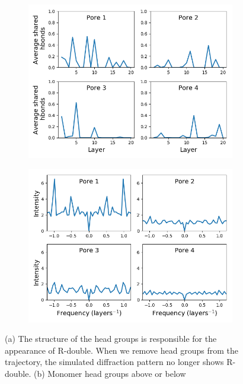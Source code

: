 \documentclass[journal=jpcbfk,manuscript=article]{achemso}
\begin{document}
\begin{figure}[!htb]
\begin{subfigure}{0.45\textwidth}
  \caption{}\label{fig:hbond_visualization}
  \end{subfigure}
  \begin{subfigure}{0.45\textwidth}
  \includegraphics[width=\textwidth]{pore_hbonds.png}
  \caption{}\label{fig:pore_hbonds}
  \end{subfigure}
  \begin{subfigure}{0.45\textwidth}
  \includegraphics[width=\textwidth]{pore_hbonds_ft.png}
  \caption{}\label{fig:pore_hbonds_ft}
  \end{subfigure}
  \caption{(a) The structure of the head groups is responsible for the appearance of
  R-double. When we remove head groups from the trajectory, the simulated 
  diffraction pattern no longer shows R-double. (b) Monomer head groups above or below
}
\end{figure}
\end{document}
